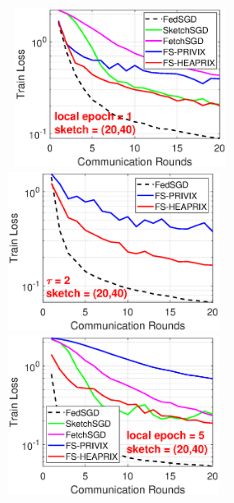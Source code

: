 \documentclass{article}
\begin{document}
\begin{figure}[H]
	\begin{center}
		\mbox{	\hspace{-0.15in}			  
		 \includegraphics[width=2.2in]{MNIST_figures/local1_sketch20_iid1_train_loss.eps} \hspace{-0.15in}
		\includegraphics[width=2.2in]{MNIST_figures/local2_sketch20_iid1_train_loss.eps} \hspace{-0.15in}
		\includegraphics[width=2.2in]{MNIST_figures/local5_sketch20_iid1_train_loss.eps}}
		

\end{center}
\end{figure}
\end{document}
